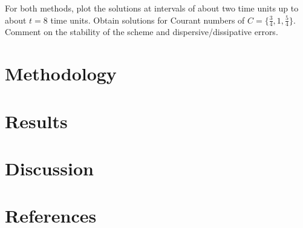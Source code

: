 \documentclass[11pt]{article}
\begin{document}
For both methods, plot the solutions at intervals of about two time units up to about $t=8$ time units. Obtain solutions for Courant numbers of $C = \{\tfrac{3}{4}, 1, \tfrac{5}{4}\}$. Comment on the stability of the scheme and dispersive/dissipative errors.

\section{Methodology} %

\section{Results} %


\section{Discussion} %

\section{References} %
\end{document}
